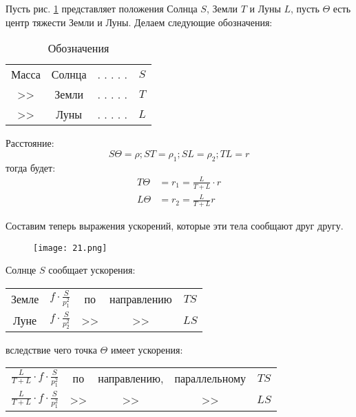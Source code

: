 \documentclass[a4paper,12pt]{article}
\begin{document}
    \begin{titlingpage}
        \maketitle
    \end{titlingpage}

    \newpage

    Пусть рис. \ref{fig:fig21} представляет положения Солнца $S$, Земли $T$ и Луны $L$, пусть $\Theta$ есть центр тяжести Земли и Луны. Делаем следующие обозначения:
    \begin{table}[h]
        \centering
        \caption{Обозначения}\label{tab:designations}
        \begin{tabular}{cccc}
           Масса & Солнца & . . . . . & $S$ \\
           >>    & Земли  & . . . . . & $T$ \\
           >>    & Луны   & . . . . . & $L$ \\
        \end{tabular}
    \end{table}

    Расстояние:
    \[S\Theta=\rho;ST=\rho_1; SL=\rho_2; TL=r\]
    тогда будет:
    \begin{equation}
        \begin{aligned}
            T\Theta &= r_1 = \frac{L}{T + L} \cdot r \\
            L\Theta &= r_2 = \frac{L}{T + L} r
        \end{aligned}
    \end{equation}

    Составим теперь выражения ускорений, которые эти тела сообщают друг другу.
    \begin{figure}[h]
        \centering
        \texttt{[image: 21.png]}
        \caption{}\label{fig:fig21}
    \end{figure}

    Солнце $S$ сообщает ускорения:
    \begin{center}
        \begin{tabular}{ccccc}
            Земле & $\displaystyle f \cdot \frac{S}{p_1^2}$ & по & направлению & $TS$ \\[2ex]
            Луне  & $\displaystyle f \cdot \frac{S}{p_2^2}$ & >> & >>          & $LS$ \\
        \end{tabular}
    \end{center}
    вследствие чего точка $\Theta$ имеет ускорения:
    \begin{center}
        \begin{tabular}{ccccc}
            $\displaystyle \frac{L}{T + L} \cdot f \cdot \frac{S}{p_1^2}$ & по & направлению, & параллельному & $TS$ \\[2ex]
            $\displaystyle \frac{L}{T + L} \cdot f \cdot \frac{S}{p_1^2}$ & >> & >> & >> & $LS$ \\
        \end{tabular}
    \end{center}
\end{document}
